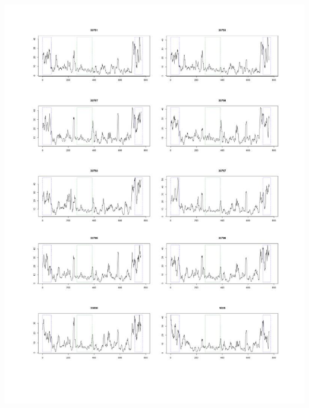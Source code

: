 \documentclass[a4paper, 12pt]{article}
\begin{document}
\begin{onehalfspace}
\begin{center}
\includegraphics[scale=0.64]{pic_Data/ane2-2.jpg}\\
\thispagestyle{empty}

\end{center}
\end{onehalfspace}
\end{document}
